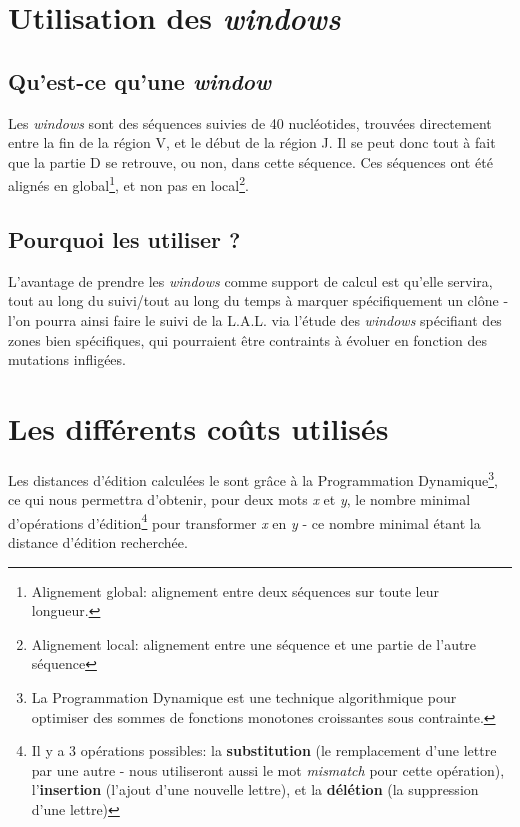 \documentclass[12pt]{report}
\begin{document}
\begin{spacing}{1.2}
\section{Utilisation des \textit{windows}}

\subsection{Qu'est-ce qu'une \textit{window}}

Les \textit{windows} sont des séquences suivies de 40 nucléotides, trouvées directement entre la fin de la région V, et le début de la région J. Il se peut donc tout à fait que la partie D se retrouve, ou non, dans cette séquence.
\newline
Ces séquences ont été alignés en global\footnote{Alignement global: alignement entre deux séquences sur toute leur longueur.}, et non pas en local\footnote{Alignement local: alignement entre une séquence et une partie de l'autre séquence}.

\subsection{Pourquoi les utiliser ?}

L'avantage de prendre les \textit{windows} comme support de calcul est qu'elle servira, tout au long du suivi/tout au long du temps à marquer spécifiquement un clône - l'on pourra ainsi faire le suivi de la L.A.L. via l'étude des \textit{windows} spécifiant des zones bien spécifiques, qui pourraient être contraints à évoluer en fonction des mutations infligées.

\section{Les différents coûts utilisés}

Les distances d'édition calculées le sont grâce à la Programmation Dynamique\footnote{La Programmation Dynamique est une technique algorithmique pour optimiser des sommes de fonctions monotones croissantes sous contrainte.}, ce qui nous permettra d'obtenir, pour deux mots \textit{x} et \textit{y}, le nombre minimal d’opérations d’édition\footnote{Il y a 3 opérations possibles: la \textbf{substitution} (le remplacement d'une lettre par une autre - nous utiliseront aussi le mot \textit{mismatch} pour cette opération), l'\textbf{insertion} (l'ajout d'une nouvelle lettre), et la \textbf{délétion} (la suppression d'une lettre)} pour transformer \textit{x} en \textit{y} - ce nombre minimal étant la distance d'édition recherchée.


\end{spacing}
\end{document}
